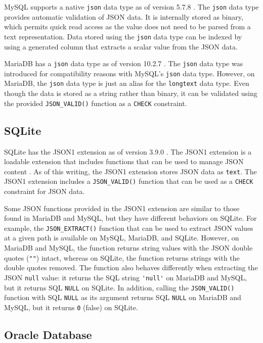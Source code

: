 MySQL supports a native \verb|json| data type as of version 5.7.8
\cite{mysql:json}. The \verb|json| data type provides automatic validation of
JSON data. It is internally stored as binary, which permits quick read access
as the value does not need to be parsed from a text representation. Data stored
using the \verb|json| data type can be indexed by using a generated column that
extracts a scalar value from the JSON data.

MariaDB has a \verb|json| data type as of version 10.2.7 \cite{mariadb:json}.
The \verb|json| data type was introduced for compatibility reasons with MySQL's
\verb|json| data type. However, on MariaDB, the \verb|json| data type is just
an alias for the \verb|longtext| data type. Even though the data is stored as a
string rather than binary, it can be validated using the provided
\verb|JSON_VALID()| function as a \verb|CHECK| constraint.

\subsection{SQLite}

SQLite has the JSON1 extension as of version 3.9.0 \cite{sqlite:3.9.0}. The
JSON1 extension is a loadable extension that includes functions that can be
used to manage JSON content \cite{sqlite:json1}. As of this writing, the JSON1
extension stores JSON data as \verb|text|. The JSON1 extension includes a
\verb|JSON_VALID()| function that can be used as a \verb|CHECK| constraint for
JSON data.

Some JSON functions provided in the JSON1 extension are similar to those found
in MariaDB and MySQL, but they have different behaviors on SQLite. For example,
the \verb|JSON_EXTRACT()| function that can be used to extract JSON values at a
given path is available on MySQL, MariaDB, and SQLite. However, on MariaDB and
MySQL, the function returns string values with the JSON double quotes
(\verb|""|) intact, whereas on SQLite, the function returns strings with the
double quotes removed. The function also behaves differently when extracting
the JSON \verb|null| value: it returns the SQL string \verb|'null'| on MariaDB
and MySQL, but it returns SQL \verb|NULL| on SQLite. In addition, calling the
\verb|JSON_VALID()| function with SQL \verb|NULL| as its argument returns SQL
\verb|NULL| on MariaDB and MySQL, but it returns \verb|0| (false) on SQLite.

\subsection{Oracle Database}

